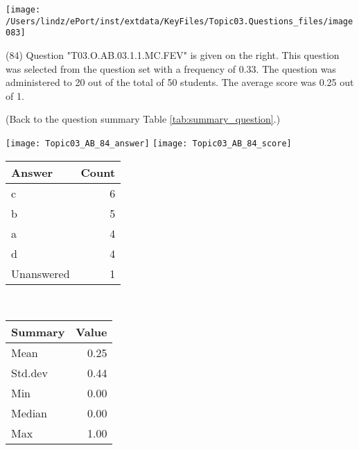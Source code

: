 \documentclass[12pt,english,nohyper]{tufte-handout}\usepackage[]{graphicx}\usepackage[]{color}
\begin{document}
\vspace{6cm}\begin{marginfigure}\texttt{[image: /Users/lindz/ePort/inst/extdata/KeyFiles/Topic03.Questions\_files/image083]}\end{marginfigure}\vspace{-6cm} (84) Question "T03.O.AB.03.1.1.MC.FEV" is given on the right. This question was selected from the question set with a frequency of 0.33. The question was administered to 20 out of the total of 50 students. The average score was 0.25 out of 1.

 (Back to the question summary Table \ref{tab:summary_question}.)

\begin{center} \texttt{[image: Topic03\_AB\_84\_answer]} \texttt{[image: Topic03\_AB\_84\_score]} \end{center} 

\begin{center}%
\begin{tabular}{lr}
  \hline
Answer & Count \\ 
  \hline
c &   6 \\ 
  b &   5 \\ 
  a &   4 \\ 
  d &   4 \\ 
  Unanswered &   1 \\ 
   \hline
\end{tabular}
~~~~~~~~%
\begin{tabular}{lr}
  \hline
Summary & Value \\ 
  \hline
Mean & 0.25 \\ 
  Std.dev & 0.44 \\ 
  Min & 0.00 \\ 
  Median & 0.00 \\ 
  Max & 1.00 \\ 
   \hline
\end{tabular}
\end{center}\newpage{}
\end{document}
